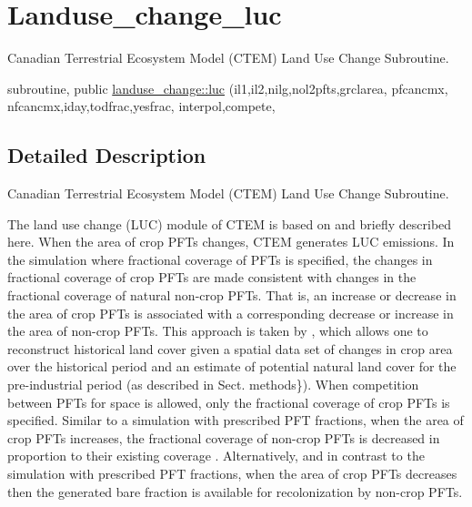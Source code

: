 \hypertarget{group__landuse__change__luc}{}\section{Landuse\+\_\+change\+\_\+luc}
\label{group__landuse__change__luc}


Canadian Terrestrial Ecosystem Model (C\+T\+E\+M) Land Use Change Subroutine.  


\begin{DoxyCompactItemize}
\item 
subroutine, public \hyperlink{group__landuse__change__luc_ga2c6b3a127a7a9e0357442ba402deb31b}{landuse\+\_\+change\+::luc} (il1,il2,nilg,nol2pfts,grclarea, pfcancmx, nfcancmx,iday,todfrac,yesfrac, interpol,compete,
\end{DoxyCompactItemize}


\subsection{Detailed Description}
Canadian Terrestrial Ecosystem Model (C\+T\+E\+M) Land Use Change Subroutine. 

The land use change (L\+U\+C) module of C\+T\+E\+M is based on \cite{Arora2010-416} and briefly described here. When the area of crop P\+F\+Ts changes, C\+T\+E\+M generates L\+U\+C emissions. In the simulation where fractional coverage of P\+F\+Ts is specified, the changes in fractional coverage of crop P\+F\+Ts are made consistent with changes in the fractional coverage of natural non-\/crop P\+F\+Ts. That is, an increase or decrease in the area of crop P\+F\+Ts is associated with a corresponding decrease or increase in the area of non-\/crop P\+F\+Ts. This approach is taken by \cite{Wang2006-he}, which allows one to reconstruct historical land cover given a spatial data set of changes in crop area over the historical period and an estimate of potential natural land cover for the pre-\/industrial period (as described in Sect. methods\}). When competition between P\+F\+Ts for space is allowed, only the fractional coverage of crop P\+F\+Ts is specified. Similar to a simulation with prescribed P\+F\+T fractions, when the area of crop P\+F\+Ts increases, the fractional coverage of non-\/crop P\+F\+Ts is decreased in proportion to their existing coverage \cite{Wang2006-he}. Alternatively, and in contrast to the simulation with prescribed P\+F\+T fractions, when the area of crop P\+F\+Ts decreases then the generated bare fraction is available for recolonization by non-\/crop P\+F\+Ts.

